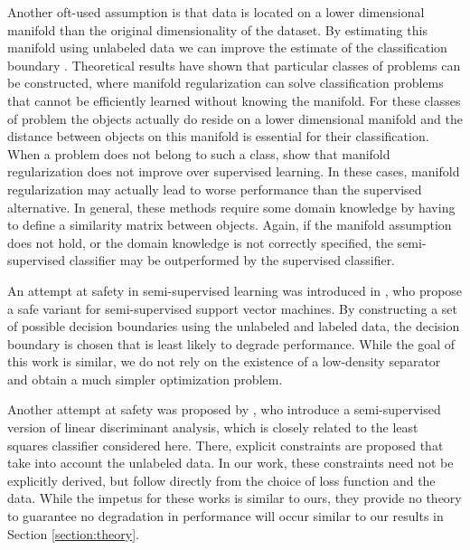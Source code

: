 \documentclass[twoside]{memoir}\usepackage[]{graphicx}\usepackage{xcolor}
\begin{document}
Another oft-used assumption is that data is located on a lower dimensional manifold than the original dimensionality of the dataset. By estimating this manifold using unlabeled data we can improve the estimate of the classification boundary \citep{Zhu2003}. Theoretical results have shown that particular classes of problems can be constructed, where manifold regularization can solve classification problems \citep{Niyogi2013} that cannot be efficiently learned without knowing the manifold. For these classes of problem the objects actually do reside on a lower dimensional manifold and the distance between objects on this manifold is essential for their classification. When a problem does not belong to such a class, \citet{Lafferty2007} show that manifold regularization does not improve over supervised learning. In these cases, manifold regularization may actually lead to worse performance than the supervised alternative. In general, these methods require some domain knowledge by having to define a similarity matrix between objects. Again, if the manifold assumption does not hold, or the domain knowledge is not correctly specified, the semi-supervised classifier may be outperformed by the supervised classifier.

An attempt at safety in semi-supervised learning was introduced in \citet{Li2011}, who propose a safe variant for semi-supervised support vector machines. By constructing a set of possible decision boundaries using the unlabeled and labeled data, the decision boundary is chosen that is least likely to degrade performance. While the goal of this work is similar, we do not rely on the existence of a low-density separator and obtain a much simpler optimization problem. 

Another attempt at safety was proposed by \citet{Loog2010,Loog2014a}, who introduce a semi-supervised version of linear discriminant analysis, which is closely related to the least squares classifier considered here. There, explicit constraints are proposed that take into account the unlabeled data. In our work, these constraints need not be explicitly derived, but follow  directly from the choice of loss function and the data. While the impetus for these works is similar to ours, they provide no theory to guarantee no degradation in performance will occur similar to our results in Section \ref{section:theory}.
\end{document}

